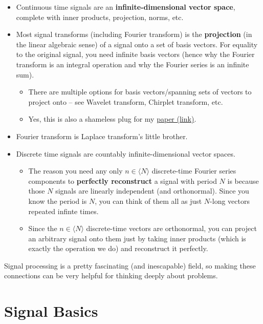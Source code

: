 \documentclass[a4paper,12pt]{report}
\begin{document}
\begin{itemize}
\item Continuous time signals are an \textbf{infinite-dimensional vector space}, complete with inner products, projection, norms, etc.
\item Most signal transforms (including Fourier transform) is the \textbf{projection} (in the linear algebraic sense) of a signal onto a set of basis vectors. For equality to the original signal, you need infinite basis vectors (hence why the Fourier transform is an integral operation and why the Fourier series is an infinite sum).
\begin{itemize}
\item There are multiple options for basis vectors/spanning sets of vectors to project onto -- see Wavelet transform, Chirplet transform, etc.
\item Yes, this is also a shameless plug for my \href{https://archive.org/details/bhargava-a-4-margins-adaptive-chirplet-transform-based-machine-learning-for-p-30}{paper (link)}.
\end{itemize}
\item Fourier transform is Laplace transform's little brother.
\item Discrete time signals are countably infinite-dimensional vector spaces. 
\begin{itemize}
\item The reason you need any only $n\in \langle N \rangle$ discrete-time Fourier series components to \textbf{perfectly reconstruct} a signal with period $N$ is because those $N$ signals are linearly independent (and orthonormal). Since you know the period is $N$, you can think of them all as just $N$-long vectors repeated infinte times. 
\item Since the $n\in \langle N \rangle$ discrete-time vectors are orthonormal, you can project an arbitrary signal onto them just by taking inner products (which is exactly the operation we do) and reconstruct it perfectly. 
\end{itemize}
\end{itemize}

Signal processing is a pretty fascinating (and inescapable) field, so making these connections can be very helpful for thinking deeply about problems. 






\chapter{Signal Basics}
\end{document}
